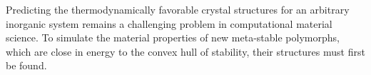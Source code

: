 %



%
Predicting the thermodynamically favorable crystal structures for an arbitrary inorganic system remains a challenging problem in computational material science.\cite{Woodley2008}
%
%
To simulate the material properties of new meta-stable polymorphs, which are close in energy to the convex hull of stability, their structures must first be found. 

